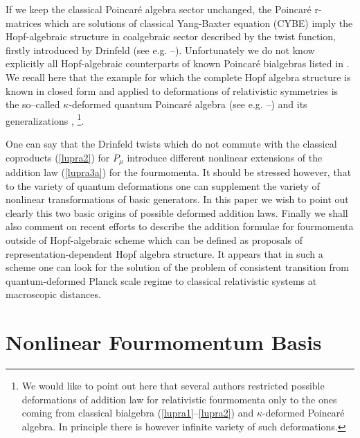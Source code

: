 \documentclass[a4paper,a4paper]{article}
\begin{document}
If we keep the classical Poincar\'{e} algebra sector unchanged,
the Poincar\'{e} r-matrices which are solutions of classical
Yang-Baxter equation (CYBE) imply the Hopf-algebraic structure in
coalgebraic sector described by the twist function, firstly
introduced by Drinfeld (see e.g. \cite{dr2}--\cite{klm}).
Unfortunately we do not know explicitly all Hopf-algebraic
counterparts of known Poincar\'{e} bialgebras listed in
\cite{zak}. We recall here that the example for which the complete
Hopf algebra structure is known in closed form and applied to
deformations of relativistic symmetries is the so--called
$\kappa$-deformed  quantum Poincar\'{e} algebra (see e.g.
\cite{lnt}--\cite{lrz}) and its generalizations \cite{km},
\cite{llm}\footnote{We would like to  point out here that several
authors restricted possible deformations of addition law for
relativistic fourmomenta only to the ones coming from classical
bialgebra (\ref{lupra1}--\ref{lupra2}) and $\kappa$-deformed
Poincar\'{e} algebra. In principle there is however  infinite
variety of such deformations.}.

One can say that the Drinfeld twists which do not commute with the
classical coproducts (\ref{lupra2}) for $P_\mu$ introduce
different nonlinear extensions of the addition law (\ref{lupra3a})
for the fourmomenta. It should be stressed however, that to the
variety of quantum deformations one can supplement the variety of
nonlinear transformations of basic generators. In this paper we
wish to point out clearly this two basic origins of possible
deformed addition laws. Finally we shall also comment on recent
efforts to describe the  addition formulae for fourmomenta outside
of Hopf-algebraic scheme which can be defined as proposals of
representation-dependent Hopf algebra structure. It appears that
in such a scheme one can look for the solution of the problem of
consistent transition from quantum-deformed Planck scale regime 
to
classical relativistic systems at macroscopic distances.



\section{Nonlinear Fourmomentum Basis}
\setcounter{equation}{0}
\end{document}
